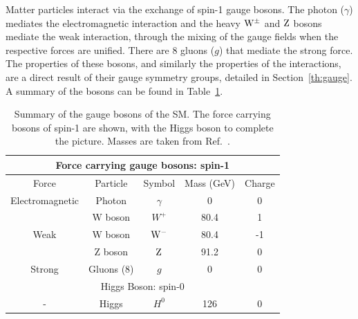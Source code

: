 Matter particles interact via the exchange of spin-1 gauge bosons. 
The photon ($\gamma$) mediates the electromagnetic interaction and the heavy $\mathrm{W}^{\pm}$ and $\mathrm{Z}$ bosons mediate the weak interaction, through the mixing of the gauge fields when the respective forces are unified. There are 8  gluons ($g$) that mediate the strong force.
The properties of these bosons, and similarly the properties of the interactions, are a direct result of their gauge symmetry groups, detailed in Section~\ref{th:gauge}.
A summary of the bosons can be found in Table~\ref{tab:SMbosons}.
%
%
%

\begin{table}
\begin{tabular}[ht!]{c|cccc}	
\hline
\multicolumn{5}{c}{Force carrying gauge bosons: spin-1} \\ \hline
Force & Particle & Symbol & Mass (GeV) & Charge \\ \hline
Electromagnetic & Photon & $\gamma$ & 0 & 0 \\ 
\multirow{3}{*}{Weak} & W boson & $W^{+}$ & 80.4 & 1 \\
& W boson & $\mathrm{W}^{-}$ & 80.4 & -1 \\
& Z boson & $\mathrm{Z}$ & 91.2 & 0 \\
Strong & Gluons (8) & $g$ & 0 & 0 \\ \hline
\multicolumn{5}{c}{Higgs Boson: spin-0} \\ \hline
- & Higgs & $H^{0}$ & 126 & 0 \\ \hline
\end{tabular}
\caption{\label{tab:SMbosons}Summary of the gauge bosons of the \ac{SM}. The force carrying bosons of spin-1 are shown, with the Higgs boson to complete the picture. Masses are taken from Ref.~\cite{PDG}.}

\end{table}

